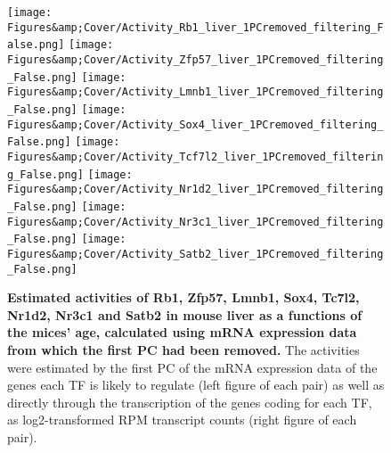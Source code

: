 \begin{figure}
    \centering
    \texttt{[image: Figures\&amp;Cover/Activity\_Rb1\_liver\_1PCremoved\_filtering\_False.png]}
    \hspace{0.25cm}
    \vspace{0.25cm}
    \texttt{[image: Figures\&amp;Cover/Activity\_Zfp57\_liver\_1PCremoved\_filtering\_False.png]}
    \vspace{0.25cm}
    \texttt{[image: Figures\&amp;Cover/Activity\_Lmnb1\_liver\_1PCremoved\_filtering\_False.png]}
    \hspace{0.25cm}
    \texttt{[image: Figures\&amp;Cover/Activity\_Sox4\_liver\_1PCremoved\_filtering\_False.png]}
    \vspace{0.25cm}
    \texttt{[image: Figures\&amp;Cover/Activity\_Tcf7l2\_liver\_1PCremoved\_filtering\_False.png]}
    \hspace{0.25cm}
    \texttt{[image: Figures\&amp;Cover/Activity\_Nr1d2\_liver\_1PCremoved\_filtering\_False.png]}
    \vspace{0.25cm}
    \texttt{[image: Figures\&amp;Cover/Activity\_Nr3c1\_liver\_1PCremoved\_filtering\_False.png]}
    \hspace{0.25cm}
    \texttt{[image: Figures\&amp;Cover/Activity\_Satb2\_liver\_1PCremoved\_filtering\_False.png]}
    \caption{\textbf{Estimated activities of Rb1, Zfp57, Lmnb1, Sox4, Tc7l2, Nr1d2, Nr3c1 and Satb2 in mouse liver as a functions of the mices' age, calculated using mRNA expression data from which the first \ac{PC} had been removed.} The activities were estimated by the first \ac{PC} of the mRNA expression data of the genes each \ac{TF} is likely to regulate (left figure of each pair) as well as directly through the transcription of the genes coding for each \ac{TF}, as log2-transformed \ac{RPM} transcript counts (right figure of each pair).}
    \label{fig:LiverEstsClean2}
\end{figure}